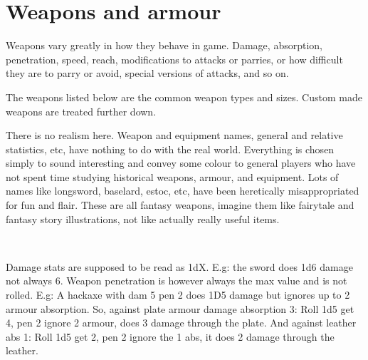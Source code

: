 






\section*{Weapons and armour}

Weapons vary greatly in how they behave in game. Damage, absorption, penetration, speed, reach, modifications to attacks or parries, or how difficult they are to parry or avoid, special versions of attacks, and so on.

The weapons listed below are the common weapon types and sizes. Custom made weapons are treated further down.

There is no realism here. Weapon and equipment names, general and relative statistics, etc, have nothing to do with the real world. Everything is chosen simply to sound interesting and convey some colour to general players who have not spent time studying historical weapons, armour, and equipment. Lots of names like longsword, baselard, estoc, etc, have been heretically misappropriated for fun and flair. These are all fantasy weapons, imagine them like fairytale and fantasy story illustrations, not like actually really useful items.

\

Damage stats are supposed to be read as 1dX. E.g: the sword does 1d6 damage not always 6. Weapon penetration is however always the max value and is not rolled. E.g: A hackaxe with dam 5 pen 2 does 1D5 damage but ignores up to 2 armour absorption. So, against plate armour damage absorption 3: Roll 1d5 get 4, pen 2 ignore 2 armour, does 3 damage through the plate. And against leather abs 1: Roll 1d5 get 2, pen 2 ignore the 1 abs, it does 2 damage through the leather.



